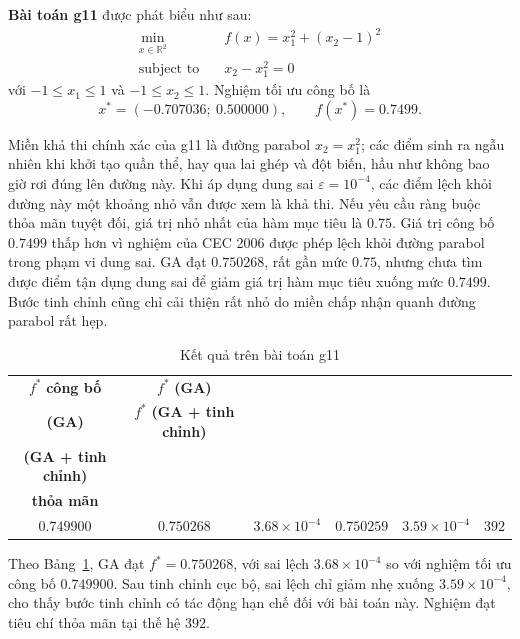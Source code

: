 \vspace{1em}

\textbf{Bài toán g11} được phát biểu như sau:
\begin{equation}
\begin{aligned}
\min_{x \in \mathbb{R}^{2}} \quad
& f(x) = x_1^2 + (x_2 - 1)^2 \\
\text{subject to} \quad
& x_2 - x_1^2 = 0
\end{aligned}
\label{eq:g11}
\end{equation}
với $-1 \le x_1 \le 1$ và $-1 \le x_2 \le 1$. Nghiệm tối ưu công bố là
\[
x^{*} = (-0.707036;\ 0.500000), \qquad f(x^{*}) = 0.7499.
\]

Miền khả thi chính xác của g11 là đường parabol $x_2=x_1^2$; các điểm
sinh ra ngẫu nhiên khi khởi tạo quần thể, hay qua lai ghép và đột
biến, hầu như không bao giờ rơi đúng lên đường này. Khi áp dụng dung
sai $\varepsilon=10^{-4}$, các điểm lệch khỏi đường này một khoảng nhỏ
vẫn được xem là khả thi. Nếu yêu cầu ràng buộc thỏa mãn
tuyệt đối, giá trị nhỏ nhất của hàm mục tiêu là $0.75$. Giá trị công
bố $0.7499$ thấp hơn vì nghiệm của CEC 2006 được phép lệch khỏi
đường parabol trong phạm vi dung sai. GA đạt $0.750268$, rất gần mức
$0.75$, nhưng chưa tìm được điểm tận dụng dung sai để giảm giá trị
hàm mục tiêu xuống mức $0.7499$. Bước tinh chỉnh cũng chỉ cải thiện
rất nhỏ do miền chấp nhận quanh đường parabol rất hẹp.

\begin{table}[htbp]
\centering
\caption{Kết quả trên bài toán g11}
\label{tab:kq-g11}
\footnotesize
\setlength{\tabcolsep}{2pt}
\begin{tabular}{cccccc}
\toprule
$f^{*}$ \textbf{công bố} & $f^{*}$ \textbf{(GA)}
& \shortstack{\textbf{Sai lệch}\\\textbf{(GA)}} & $f^{*}$ \textbf{(GA + tinh chỉnh)}
& \shortstack{\textbf{Sai lệch}\\\textbf{(GA + tinh chỉnh)}}
& \shortstack{\textbf{Số thế hệ}\\\textbf{thỏa mãn}} \\
\midrule
$0.749900$ & $0.750268$ & $3.68\times10^{-4}$ & $0.750259$ & $3.59\times10^{-4}$ & $392$ \\
\bottomrule
\end{tabular}
\end{table}

Theo Bảng~\ref{tab:kq-g11}, GA đạt $f^{*}=0.750268$, với sai lệch
$3.68\times10^{-4}$ so với nghiệm tối ưu công bố $0.749900$. Sau
tinh chỉnh cục bộ, sai lệch chỉ giảm nhẹ xuống $3.59\times10^{-4}$,
cho thấy bước tinh chỉnh có tác động hạn chế đối với bài toán này.
Nghiệm đạt tiêu chí thỏa mãn tại thế hệ $392$.

